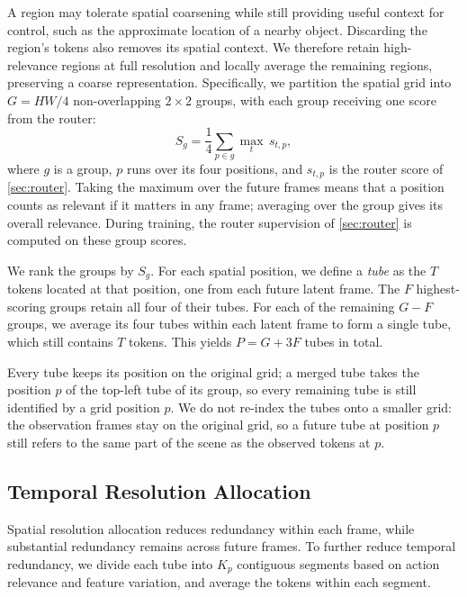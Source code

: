 A region may tolerate spatial coarsening while still providing useful context for control, such as the approximate location of a nearby object.
Discarding the region's tokens also removes its spatial context.
We therefore retain high-relevance regions at full resolution and locally average the remaining regions, preserving a coarse representation. Specifically, we partition the spatial grid into $G=HW/4$ non-overlapping $2\times2$ groups, with each group receiving one score from the router:
\begin{equation}
  S_g = \frac{1}{4} \sum_{p \in g} \max_t \, s_{t,p} ,
  \label{eq:group_score}
\end{equation}
where $g$ is a group, $p$ runs over its four positions, and $s_{t,p}$ is the router score of \cref{sec:router}.
Taking the maximum over the future frames means that a position counts as relevant if it matters in any frame;
averaging over the group gives its overall relevance.
During training, the router supervision of \cref{sec:router} is computed on these group scores.

We rank the groups by \(S_g\). For each spatial position, we define a \emph{tube} as the \(T\) tokens located at that position, one from each future latent frame. The \(F\) highest-scoring groups retain all four of their tubes. For each of the remaining \(G-F\) groups, we average its four tubes within each latent frame to form a single tube, which still contains \(T\) tokens. This yields \(P=G+3F\) tubes in total.

Every tube keeps its position on the original grid; a merged tube takes the position $p$ of the top-left tube of its group,
so every remaining tube is still identified by a grid position $p$.
We do not re-index the tubes onto a smaller grid:
the observation frames stay on the original grid, so a future tube at position $p$ still refers to the same part of the scene as the observed tokens at $p$.

\subsection{Temporal Resolution Allocation}
\label{sec:temporal}

Spatial resolution allocation reduces redundancy within each frame, while substantial redundancy remains across future frames. To further reduce temporal redundancy, we divide each tube into \(K_p\) contiguous segments based on action relevance and feature variation, and average the tokens within each segment.


